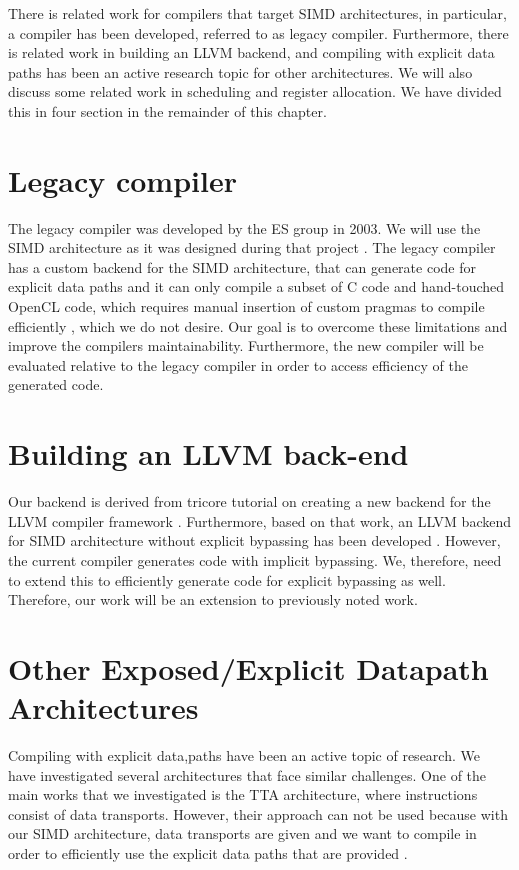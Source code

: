 There is related work for compilers that target SIMD architectures, in particular, a compiler has been developed, referred to as legacy compiler. Furthermore, there is related work in building an LLVM backend, and compiling with explicit data paths has been an active research topic for other architectures. We will also discuss some related work in scheduling and register allocation. We have divided this in four section in the remainder of this chapter.

\section{Legacy compiler}
The legacy compiler was developed by the ES group in 2003. We will use the SIMD architecture as it was designed during that project \cite{simd}. The legacy compiler has a custom backend for the SIMD architecture, that can generate code for explicit data paths \cite{dongrio1} and it can only compile a subset of C code and hand-touched OpenCL code, which requires manual insertion of custom pragmas to compile efficiently \cite{dongrio2}, which we do not desire. Our goal is to overcome these limitations and improve the compilers maintainability. Furthermore, the new compiler will be evaluated relative to the legacy compiler in order to access efficiency of the generated code.

\section{Building an LLVM back-end}
Our backend is derived from tricore tutorial on creating a new backend for the LLVM compiler framework \cite{tricore}. Furthermore, based on that work, an LLVM backend for SIMD architecture without explicit bypassing has been developed \cite{liu_zhenyuan}. However, the current compiler generates code with implicit bypassing. We, therefore, need to extend this to efficiently generate code for explicit bypassing as well. Therefore, our work will be an extension to previously noted work.

\section{Other Exposed/Explicit Datapath Architectures}
Compiling with explicit data,paths have been an active topic of research. We have investigated several architectures that face similar challenges. One of the main works that we investigated is the TTA architecture, where instructions consist of data transports. However, their approach can not be used because with our SIMD architecture, data transports are given and we want to compile in order to efficiently use the explicit data paths that are provided \cite{tta, tta_codegen}.

